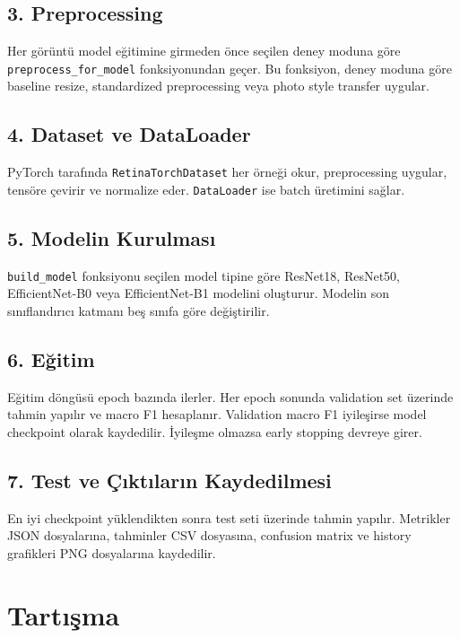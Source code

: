 \documentclass[12pt,a4paper]{article}
\begin{document}
\subsection{3. Preprocessing}

Her görüntü model eğitimine girmeden önce seçilen deney moduna göre \texttt{preprocess\_for\_model} fonksiyonundan geçer. Bu fonksiyon, deney moduna göre baseline resize, standardized preprocessing veya photo style transfer uygular.

\subsection{4. Dataset ve DataLoader}

PyTorch tarafında \texttt{RetinaTorchDataset} her örneği okur, preprocessing uygular, tensöre çevirir ve normalize eder. \texttt{DataLoader} ise batch üretimini sağlar.

\subsection{5. Modelin Kurulması}

\texttt{build\_model} fonksiyonu seçilen model tipine göre ResNet18, ResNet50, EfficientNet-B0 veya EfficientNet-B1 modelini oluşturur. Modelin son sınıflandırıcı katmanı beş sınıfa göre değiştirilir.

\subsection{6. Eğitim}

Eğitim döngüsü epoch bazında ilerler. Her epoch sonunda validation set üzerinde tahmin yapılır ve macro F1 hesaplanır. Validation macro F1 iyileşirse model checkpoint olarak kaydedilir. İyileşme olmazsa early stopping devreye girer.

\subsection{7. Test ve Çıktıların Kaydedilmesi}

En iyi checkpoint yüklendikten sonra test seti üzerinde tahmin yapılır. Metrikler JSON dosyalarına, tahminler CSV dosyasına, confusion matrix ve history grafikleri PNG dosyalarına kaydedilir.

\section{Tartışma}
\end{document}
